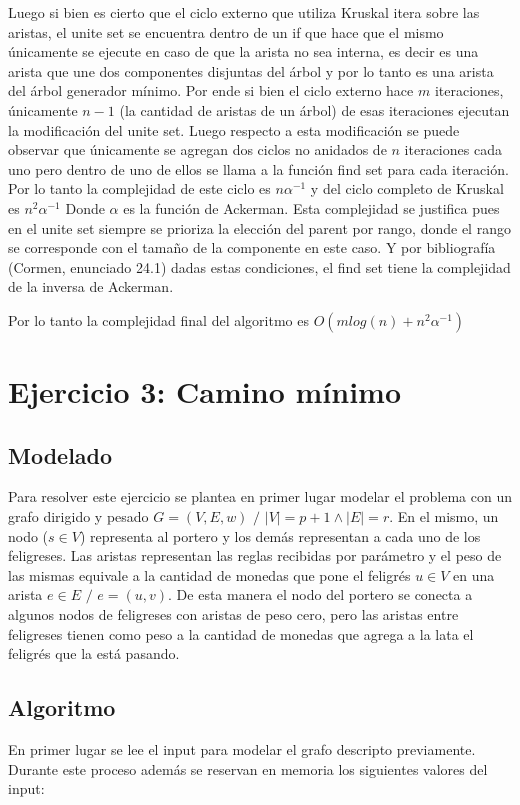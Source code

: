 \documentclass[a4paper]{article}
\begin{document}
Luego si bien es cierto que el ciclo externo que utiliza Kruskal itera sobre las aristas, el unite set se encuentra dentro de un if que hace que el mismo únicamente se ejecute en caso de que la arista no sea interna, es decir es una arista que une dos componentes disjuntas del árbol y por lo tanto es una arista del árbol generador mínimo. Por ende si bien el ciclo externo hace $m$ iteraciones, únicamente $n-1$ (la cantidad de aristas de un árbol) de esas iteraciones ejecutan la modificación del unite set. Luego respecto a esta modificación se puede observar que únicamente se agregan dos ciclos no anidados de $n$ iteraciones cada uno pero dentro de uno de ellos se llama a la función find set para cada iteración. Por lo tanto la complejidad de este ciclo es $n \alpha^{-1} $ y del ciclo completo de Kruskal es  $n^2 \alpha^{-1} $  Donde $\alpha$ es la función de Ackerman. Esta complejidad se justifica pues en el unite set siempre se prioriza la elección del parent por rango, donde el rango se corresponde con el tamaño de la componente en este caso. Y por bibliografía (Cormen, enunciado 24.1) dadas estas condiciones, el find set tiene la complejidad de la inversa de Ackerman.

Por lo tanto la complejidad final del algoritmo es $O(mlog(n) + n^2 \alpha^{-1})$

\section{Ejercicio 3: Camino mínimo}


\subsection{Modelado}
Para resolver este ejercicio se plantea en primer lugar modelar el problema con un grafo dirigido y pesado $G=(V,E,w)$ $/$ $|V|= p + 1 \land |E|= r $. En el mismo, un nodo ($s \in V$) representa al portero y los demás representan a cada uno de los feligreses. Las aristas representan las reglas recibidas por parámetro y el peso de las mismas equivale a la cantidad de monedas que pone el feligrés $u \in V $ en una arista $e \in E $  $/$ $ e = (u,v)$. De esta manera el nodo del portero se conecta a algunos nodos de feligreses con aristas de peso cero, pero las aristas entre feligreses tienen como peso a la cantidad de monedas que agrega a la lata el feligrés que la está pasando.

\subsection{Algoritmo}
En primer lugar se lee el input para modelar el grafo descripto previamente. Durante este proceso además se reservan en memoria los siguientes valores del input:
\end{document}
